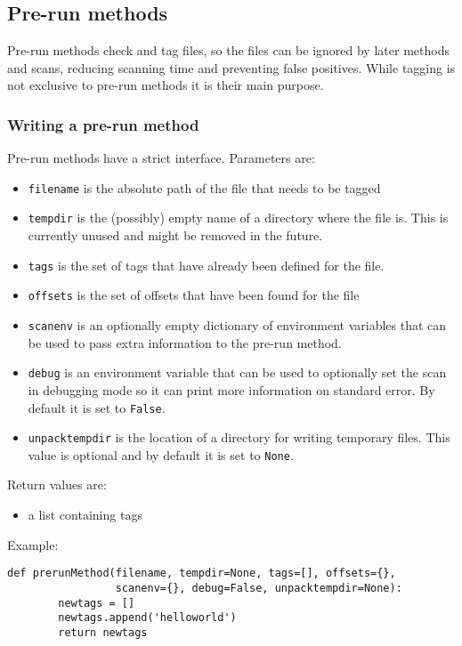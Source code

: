 \documentclass[10pt,a4paper]{article}
\begin{document}
\subsection{Pre-run methods}

Pre-run methods check and tag files, so the files can be ignored by later
methods and scans, reducing scanning time and preventing false positives. While
tagging is not exclusive to pre-run methods it is their main purpose.

\subsubsection{Writing a pre-run method}

Pre-run methods have a strict interface. Parameters are:

\begin{itemize}
\item \texttt{filename} is the absolute path of the file that needs to be tagged
\item \texttt{tempdir} is the (possibly) empty name of a directory where the
file is. This is currently unused and might be removed in the future.
\item \texttt{tags} is the set of tags that have already been defined for the
file.
\item \texttt{offsets} is the set of offsets that have been found for the file
\item \texttt{scanenv} is an optionally empty dictionary of environment variables
that can be used to pass extra information to the pre-run method.
\item \texttt{debug} is an environment variable that can be used to optionally
set the scan in debugging mode so it can print more information on standard
error. By default it is set to \texttt{False}.
\item \texttt{unpacktempdir} is the location of a directory for writing
temporary files. This value is optional and by default it is set to
\texttt{None}.
\end{itemize}

Return values are:

\begin{itemize}
\item a list containing tags
\end{itemize}

Example:

\begin{verbatim}
def prerunMethod(filename, tempdir=None, tags=[], offsets={},
                 scanenv={}, debug=False, unpacktempdir=None):
        newtags = []
        newtags.append('helloworld')
        return newtags
\end{verbatim}
\end{document}

